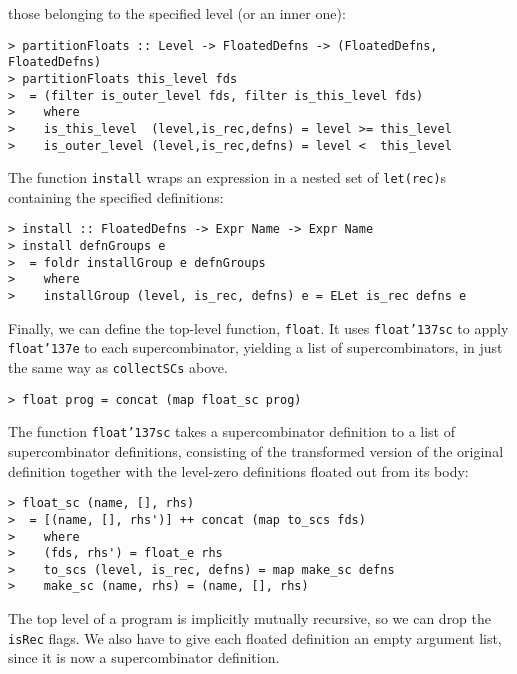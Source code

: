 those belonging to the specified level (or an inner one):
\begin{verbatim}
> partitionFloats :: Level -> FloatedDefns -> (FloatedDefns, FloatedDefns)
> partitionFloats this_level fds
>  = (filter is_outer_level fds, filter is_this_level fds)
>    where
>    is_this_level  (level,is_rec,defns) = level >= this_level
>    is_outer_level (level,is_rec,defns) = level <  this_level
\end{verbatim}
%
%
\par
The function \mbox{\tt install} wraps an expression in a
nested set of \mbox{\tt let(rec)}s containing the specified definitions:
\begin{verbatim}
> install :: FloatedDefns -> Expr Name -> Expr Name
> install defnGroups e
>  = foldr installGroup e defnGroups
>    where
>    installGroup (level, is_rec, defns) e = ELet is_rec defns e
\end{verbatim}
%
%
\par
Finally, we can define the top-level function, \mbox{\tt float}.  It uses \mbox{\tt float{\char'137}sc}
to apply \mbox{\tt float{\char'137}e} to each supercombinator, yielding a list of supercombinators,
in just the same way as \mbox{\tt collectSCs} above.
\begin{verbatim}
> float prog = concat (map float_sc prog)
\end{verbatim}
%
\par
The function \mbox{\tt float{\char'137}sc} takes a supercombinator definition to a
list of supercombinator definitions, consisting of the transformed version
of the original definition together with the level-zero definitions floated
out from its body:
\begin{verbatim}
> float_sc (name, [], rhs)
>  = [(name, [], rhs')] ++ concat (map to_scs fds)
>    where
>    (fds, rhs') = float_e rhs
>    to_scs (level, is_rec, defns) = map make_sc defns
>    make_sc (name, rhs) = (name, [], rhs)
\end{verbatim}
The top level of a program is implicitly
mutually recursive, so we can drop the \mbox{\tt isRec} flags.  We also have
to give each floated definition an empty argument list, since it is now a
supercombinator definition.

